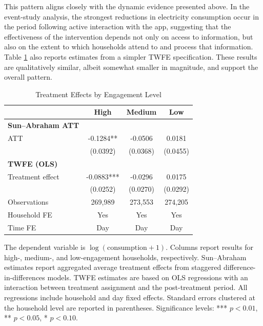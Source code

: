 This pattern aligns closely with the dynamic evidence presented above. In the event-study analysis, the strongest reductions in electricity consumption occur in the period following active interaction with the app, suggesting that the effectiveness of the intervention depends not only on access to information, but also on the extent to which households attend to and process that information. Table \ref{table:engagement_results} also reports estimates from a simpler TWFE specification. These results are qualitatively similar, albeit somewhat smaller in magnitude, and support the overall pattern.

\begin{table}[H]
\centering
\caption{Treatment Effects by Engagement Level}
\label{table:engagement_results}
\begin{threeparttable}
\begin{tabular}{lccc}
\toprule
 & High & Medium & Low \\
\midrule

\textbf{Sun--Abraham ATT} \\
ATT 
& -0.1284** 
& -0.0506 
& 0.0181 \\
& (0.0392) 
& (0.0368) 
& (0.0455) \\

\addlinespace
\textbf{TWFE (OLS)} \\
Treatment effect 
& -0.0883*** 
& -0.0296 
& 0.0175 \\
& (0.0252) 
& (0.0270) 
& (0.0292) \\

\midrule
Observations 
& 269{,}989 
& 273{,}553 
& 274{,}205 \\

Household FE & Yes & Yes & Yes \\
Time FE & Day & Day & Day \\

\bottomrule
\end{tabular}

\begin{tablenotes}[flushleft]
\footnotesize
\item The dependent variable is $\log(\text{consumption} + 1)$. Columns report results for high-, medium-, and low-engagement households, respectively. Sun--Abraham estimates report aggregated average treatment effects from staggered difference-in-differences models. TWFE estimates are based on OLS regressions with an interaction between treatment assignment and the post-treatment period. All regressions include household and day fixed effects. Standard errors clustered at the household level are reported in parentheses. Significance levels: *** $p<0.01$, ** $p<0.05$, * $p<0.10$.
\end{tablenotes}

\end{threeparttable}
\end{table}

